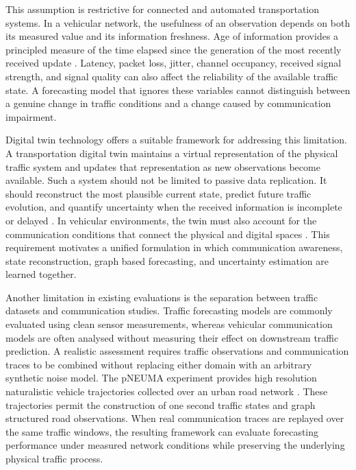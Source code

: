 \documentclass[pdflatex,sn-mathphys-num]{sn-jnl}%
\theoremstyle{thmstyleone}%
\theoremstyle{thmstyletwo}%
\theoremstyle{thmstylethree}%
\begin{document}
This assumption is restrictive for connected and automated transportation systems. In a vehicular network, the usefulness of an observation depends on both its measured value and its information freshness. Age of information provides a principled measure of the time elapsed since the generation of the most recently received update \cite{kaul2012aoi}. Latency, packet loss, jitter, channel occupancy, received signal strength, and signal quality can also affect the reliability of the available traffic state. A forecasting model that ignores these variables cannot distinguish between a genuine change in traffic conditions and a change caused by communication impairment.

Digital twin technology offers a suitable framework for addressing this limitation. A transportation digital twin maintains a virtual representation of the physical traffic system and updates that representation as new observations become available. Such a system should not be limited to passive data replication. It should reconstruct the most plausible current state, predict future traffic evolution, and quantify uncertainty when the received information is incomplete or delayed \cite{irfan2023transportationdt}. In vehicular environments, the twin must also account for the communication conditions that connect the physical and digital spaces \cite{khan2022federateddt}. This requirement motivates a unified formulation in which communication awareness, state reconstruction, graph based forecasting, and uncertainty estimation are learned together.

Another limitation in existing evaluations is the separation between traffic datasets and communication studies. Traffic forecasting models are commonly evaluated using clean sensor measurements, whereas vehicular communication models are often analysed without measuring their effect on downstream traffic prediction. A realistic assessment requires traffic observations and communication traces to be combined without replacing either domain with an arbitrary synthetic noise model. The pNEUMA experiment provides high resolution naturalistic vehicle trajectories collected over an urban road network \cite{barmpounakis2020pneuma}. These trajectories permit the construction of one second traffic states and graph structured road observations. When real communication traces are replayed over the same traffic windows, the resulting framework can evaluate forecasting performance under measured network conditions while preserving the underlying physical traffic process.
\end{document}
